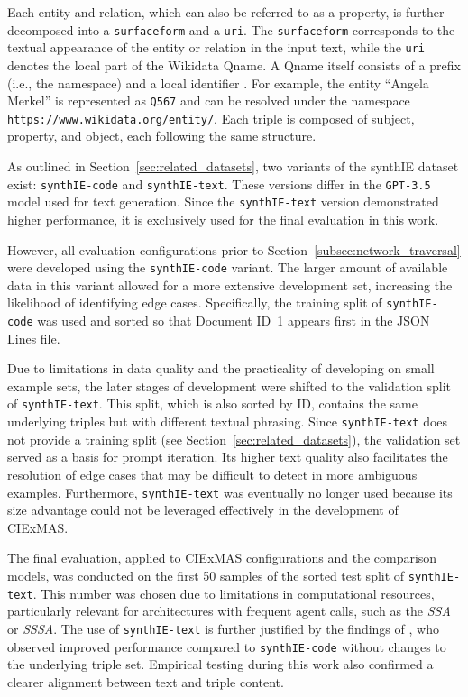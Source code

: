 \documentclass[a4paper,oneside,bibliography=totoc]{scrbook}
\begin{document}
Each entity and relation, which can also be referred to as a property, is further decomposed into a \texttt{surfaceform} and a \texttt{uri}. The \texttt{surfaceform} corresponds to the textual appearance of the entity or relation in the input text, while the \texttt{uri} denotes the local part of the Wikidata Qname. A Qname itself consists of a prefix (i.e., the namespace) and a local identifier \cite{ASF2010}. For example, the entity \enquote{Angela Merkel} is represented as \texttt{Q567} and can be resolved under the namespace \texttt{https://www.wikidata.org/entity/}. Each triple is composed of subject, property, and object, each following the same structure.

As outlined in Section~\ref{sec:related_datasets}, two variants of the synthIE dataset exist: \texttt{synthIE-code} and \texttt{synthIE-text}. These versions differ in the \texttt{GPT-3.5} model used for text generation. Since the \texttt{synthIE-text} version demonstrated higher performance, it is exclusively used for the final evaluation in this work.

However, all evaluation configurations prior to Section~\ref{subsec:network_traversal} were developed using the \texttt{synthIE-code} variant. The larger amount of available data in this variant allowed for a more extensive development set, increasing the likelihood of identifying edge cases. Specifically, the training split of \texttt{synthIE-code} was used and sorted so that Document ID~1 appears first in the JSON Lines file.

Due to limitations in data quality and the practicality of developing on small example sets, the later stages of development were shifted to the validation split of \texttt{synthIE-text}. This split, which is also sorted by ID, contains the same underlying triples but with different textual phrasing. Since \texttt{synthIE-text} does not provide a training split (see Section~\ref{sec:related_datasets}), the validation set served as a basis for prompt iteration. Its higher text quality also facilitates the resolution of edge cases that may be difficult to detect in more ambiguous examples. Furthermore, \texttt{synthIE-text} was eventually no longer used because its size advantage could not be leveraged effectively in the development of CIExMAS.

The final evaluation, applied to CIExMAS configurations and the comparison models, was conducted on the first 50 samples of the sorted test split of \texttt{synthIE-text}. This number was chosen due to limitations in computational resources, particularly relevant for architectures with frequent agent calls, such as the \textit{\ac{SSA}} or \textit{\ac{SSSA}}. The use of \texttt{synthIE-text} is further justified by the findings of \citet{Josifoski2023}, who observed improved performance compared to \texttt{synthIE-code} without changes to the underlying triple set. Empirical testing during this work also confirmed a clearer alignment between text and triple content.
\end{document}
